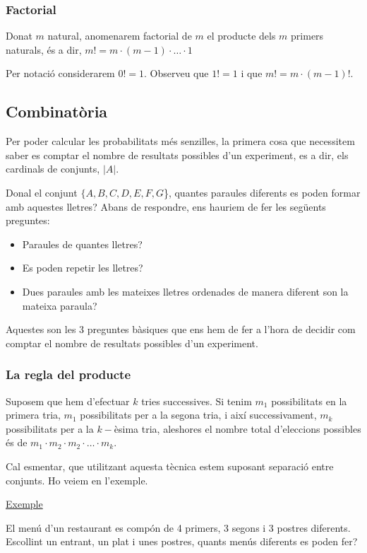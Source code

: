 \documentclass{article}
\begin{document}
\subsubsection{Factorial}
Donat $m$ natural, anomenarem factorial de $m$ el producte dels $m$ primers naturals, és a dir, $m! = m \cdot (m-1) \cdot \ldots \cdot 1$

Per notació considerarem $0! = 1$. Observeu que $1! = 1$ i que $m! = m \cdot (m - 1)!$.

\subsection{Combinatòria}
Per poder calcular les probabilitats més senzilles, la primera cosa que necessitem saber es comptar el nombre de resultats possibles d’un experiment, es a dir, els cardinals de conjunts, $|A|$. 

Donal el conjunt $\{A, B, C, D, E, F, G$\}, quantes paraules diferents es poden formar amb aquestes lletres? Abans de respondre, ens hauriem de fer les següents preguntes:

\begin{itemize}
    \item Paraules de quantes lletres?
    \item Es poden repetir les lletres?
    \item Dues paraules amb les mateixes lletres ordenades de manera diferent son la mateixa paraula?
\end{itemize}

Aquestes son les 3 preguntes bàsiques que ens hem de fer a l'hora de decidir com comptar el nombre de resultats possibles d'un experiment.

\subsubsection{La regla del producte}
Suposem que hem d’efectuar $k$ tries successives. Si tenim $m_{1}$ possibilitats en la primera tria, $m_{1}$ possibilitats per a la segona tria, i així successivament, $m_{k}$ possibilitats per a la $k-$èsima tria, aleshores el nombre total d’eleccions possibles és de $m_{1} \cdot m_{2} \cdot m_{2} \cdot \ldots \cdot m_{k}$.

Cal esmentar, que utilitzant aquesta tècnica estem suposant separació entre conjunts. Ho veiem en l'exemple.

\underline{Exemple}

El menú d’un restaurant es compón de 4 primers, 3 segons i 3 postres diferents. Escollint un entrant, un plat i unes postres, quants menús diferents es poden fer?
\end{document}
